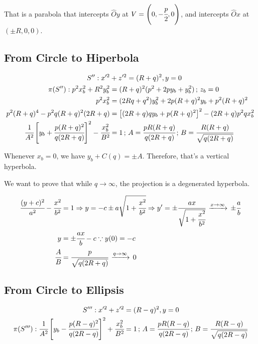 \documentclass[12pt]{article}
\numberwithin{table}{section}
\begin{document}
That is a parabola that intercepts $\hat O y$ at $V = \left(0, -\cfrac{p}{2}, 0\right)$, and intercepts $\hat Ox$ at $(\pm R, 0, 0)$.

\subsection{From Circle to Hiperbola}

\begin{align}
S'': x'^2 &+ z'^2 = (R+q)^2, y = 0 \\
\pi(S''): p^2 x_b^2 + R^2 y_b^2 &= (R+q)^2 (p^2 + 2py_b +y_b^2)\,;\,z_b=0 \\
p^2x_b^2 &= (2Rq + q^2) y_b^2 + 2p(R+q)^2 y_b + p^2(R+q)^2\\
p^2(R+q)^4 - p^2q(R+q)^2(2R + q) &= \left[(2R + q)q y_b + p(R+q)^2\right]^2-(2R+q)p^2qx_b^2 \\
\cfrac{1}{A^2} \left[y_b+\cfrac{p(R+q)^2}{q(2R + q)}\right]^2-\cfrac{x_b^2}{B^2} &= 1\,;\,A = \cfrac{pR(R+q)}{q(2R+q)}\,;\,B = \cfrac{R(R+q)}{\sqrt{q(2R+q)}}
\end{align}

Whenever $x_b = 0$, we have $y_b + C(q) = \pm A$. Therefore, that's a vertical hyperbola.

We want to prove that while $q\to \infty$, the projection is a degenerated hyperbola.

\begin{align}
\cfrac{(y + c)^2}{a^2} - \cfrac{x^2}{b^2} &= 1\Rightarrow y = -c \pm a\sqrt{1 + \cfrac{x^2}{b^2}} \Rightarrow y' = \pm  \cfrac{ax}{\sqrt{1 + \cfrac{x^2}{b^2}} } \,\xrightarrow{x \to \infty}\, \pm \cfrac{a}{b} \\
y &= \pm \cfrac{ax}{b} -c\because y(0) = - c \\
\cfrac{A}{B} &= \cfrac{p}{\sqrt{q(2R+q)}}\,\xrightarrow{q \to \infty}\,0
\end{align}

\subsection{From Circle to Ellipsis}

\begin{align}
S''': x'^2 + z'^2 &= (R-q)^2, y = 0 \\
\pi(S'''): \cfrac{1}{A^2} \left[y_b-\cfrac{p(R-q)^2}{q(2R - q)}\right]^2+\cfrac{x_b^2}{B^2} &= 1 \,;\,A = \cfrac{pR(R-q)}{q(2R-q)}\,;\,B = \cfrac{R(R-q)}{\sqrt{q(2R-q)}}
\end{align}
\end{document}
